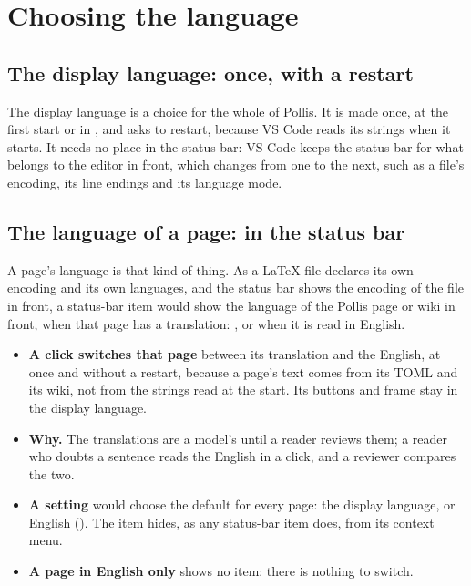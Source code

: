 \section{Choosing the language}\label{sec:choose}
\subsection{The display language: once, with a restart}
The display language is a choice for the whole of Pollis. It is made once, at the first start or in
, and asks to restart, because VS Code reads its strings when it starts. It needs no
place in the status bar: VS Code keeps the status bar for what belongs to the editor in front, which changes from one
to the next, such as a file's encoding, its line endings and its language mode.

\subsection{The language of a page: in the status bar}
A page's language is that kind of thing. As a LaTeX file declares its own encoding and its own languages, and the
status bar shows the encoding of the file in front, a status-bar item would show the language of the Pollis page or
wiki in front, when that page has a translation: , or  when it is read in English.
\begin{itemize}
  \item \textbf{A click switches that page} between its translation and the English, at once and without a restart,
    because a page's text comes from its TOML and its wiki, not from the strings read at the start. Its buttons and
    frame stay in the display language.
  \item \textbf{Why.} The translations are a model's until a reader reviews them; a reader who doubts a sentence reads
    the English in a click, and a reviewer compares the two.
  \item \textbf{A setting} would choose the default for every page: the display language, or English
    (). The item hides, as any status-bar item does, from its context menu.
  \item \textbf{A page in English only} shows no item: there is nothing to switch.
\end{itemize}

